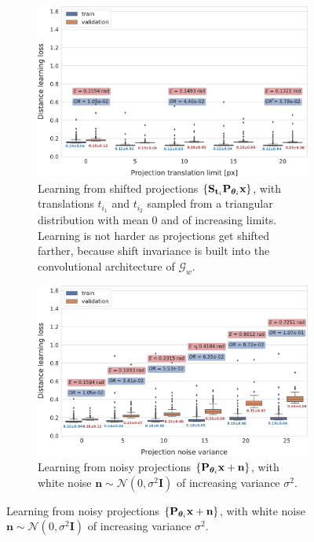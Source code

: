 \begin{figure}[ht!]
    \centering
    \begin{subfigure}[t]{0.47\linewidth}
        \includegraphics[width=\linewidth]{figures/de_translation_nums}
        \caption{%
            Learning from shifted projections $\{ \mathbf{S}_{\mathbf{t}_i} \mathbf{P}_{{\boldsymbol{\theta}}_i} \mathbf{x} \}$, with translations $t_{i_1}$ and $t_{i_2}$ sampled from a triangular distribution with mean 0 and of increasing limits.
            Learning is not harder as projections get shifted farther, because shift invariance is built into the convolutional architecture of $\mathcal{G}_w$.
    }\label{fig:results:distance-estimation:shift}
    \end{subfigure}
    \hfill
    \begin{subfigure}[t]{0.47\linewidth}
        \includegraphics[width=\linewidth]{figures/de_noises_nums}
        \caption{%
            Learning from noisy projections $\{ \mathbf{P}_{{\boldsymbol{\theta}}_i} \mathbf{x} + \mathbf{n} \}$, with white noise $\mathbf{n} \sim \mathcal{N}(0, \sigma^2\mathbf{I})$ of increasing variance $\sigma^2$.
}
\end{subfigure}
\end{figure}
